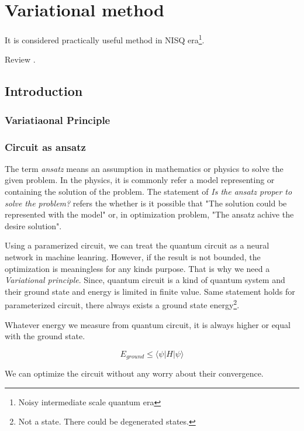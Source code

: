 \chapter{Variational method}

It is considered practically useful method in
NISQ era\footnote{Noisy intermediate scale quantum era}.


Review \cite{cerezo_variational_2021}.
\section{Introduction}

\subsection{Variatiaonal Principle}

\subsection{Circuit as ansatz}

The term \textit{ansatz} means an assumption 
in mathematics or physics to solve the given problem.
In the physics, it is commonly refer a model representing 
or containing the solution of the problem.
The statement of \textit{Is the ansatz proper to solve the problem?}
refers the whether is it possible that "The solution could be represented with the model"
or, in optimization problem, "The ansatz achive the desire solution".

Using a paramerized circuit, we can treat the quantum circuit 
as a neural network in machine leanring. 
However, if the result is not bounded, 
the optimization is meaningless for any kinds purpose.
That is why we need a \textit{Variational principle}.
Since, quantum circuit is a kind of quantum system and their
ground state and energy is limited in finite value.
Same statement holds for parameterized circuit, there always 
exists a ground state energy\footnote{Not a state. There could be degenerated states.}.

Whatever energy we measure from quantum circuit, it is always higher or equal with the ground state.

\begin{equation*}
    E_{ground} \leq \langle \psi | H | \psi \rangle
\end{equation*}


We can optimize the circuit without any worry about their convergence.


